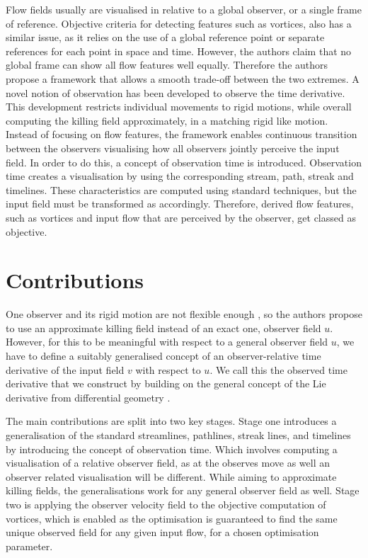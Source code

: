 \documentclass[a4paper,9pt]{article}
\begin{document}
\small 
Flow fields usually are visualised in relative to a global observer, or a single frame of reference. Objective criteria for detecting features such as vortices, also has a similar issue, as it relies on the use of a global reference point or separate references for each point in space and time. However, the authors claim that no global frame can show all flow features well equally. Therefore the authors propose a framework that allows a smooth trade-off between the two extremes. A novel notion of observation has been developed to observe the time derivative. This development restricts individual movements to rigid motions, while overall computing the killing field approximately, in a matching rigid like motion. Instead of focusing on flow features, the framework enables continuous transition between the observers visualising how all observers jointly perceive the input field. In order to do this, a concept of observation time is introduced. Observation time creates a visualisation by using the corresponding stream, path, streak and timelines. These characteristics are computed using standard techniques, but the input field must be transformed as accordingly. Therefore, derived flow features, such as vortices and input flow that are perceived by the observer, get classed as objective.

\section{Contributions}

One observer and its rigid motion are not flexible enough \cite{17, 19}, so the authors propose to use an approximate killing field instead of an exact one, observer field $u$. However, for this to be meaningful with respect to a general observer field $u$, we have to define a suitably generalised concept of an observer-relative time derivative of the input field $v$ with respect to $u$. We call this the observed time derivative that we construct by building on the general concept of the Lie derivative from differential geometry \cite{16, 29, 32}.

The main contributions are split into two key stages. Stage one introduces a generalisation of the standard streamlines, pathlines, streak lines, and timelines by introducing the concept of observation time. Which involves computing a visualisation of a relative observer field, as at the observes move as well an observer related visualisation will be different. While aiming to approximate killing fields, the generalisations work for any general observer field as well. Stage two is applying the observer velocity field to the objective computation of vortices, which is enabled as the optimisation is guaranteed to find the same unique observed field for any given input flow, for a chosen optimisation parameter.
\end{document}

